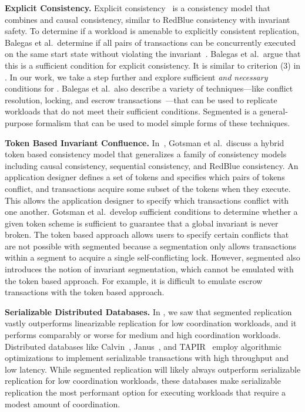 \textbf{Explicit Consistency.}
Explicit consistency~\cite{balegas2015towards} is a consistency model that
combines \invariantconfluence{} and causal consistency, similar to RedBlue
consistency with invariant safety. To determine if a workload is amenable to
explicitly consistent replication, Balegas et al.\ determine if all pairs of
transactions can be concurrently executed on the same start state without
violating the invariant~\cite{balegas2015towards}. Balegas et al.\ argue that
this is a sufficient condition for explicit consistency. It is similar to
criterion (3) in . In our work, we take a step further
and explore sufficient \emph{and necessary} conditions for
\invariantconfluence{}.
%
Balegas et al.\ also describe a variety of techniques---like conflict
resolution, locking, and escrow transactions~\cite{o1986escrow}---that can be
used to replicate workloads that do not meet their sufficient conditions.
Segmented \invariantconfluence{} is a general-purpose formalism that can be
used to model simple forms of these techniques.

\textbf{Token Based Invariant Confluence.}
In~\cite{gotsman2016cause}, Gotsman et al.\ discuss a hybrid token based
consistency model that generalizes a family of consistency models including
causal consistency, sequential consistency, and RedBlue consistency. An
application designer defines a set of tokens and specifies which pairs of
tokens conflict, and transactions acquire some subset of the tokens when they
execute. This allows the application designer to specify which transactions
conflict with one another.  Gotsman et al.\ develop sufficient conditions to
determine whether a given token scheme is sufficient to guarantee that a global
invariant is never broken. The token based approach allows users to
specify certain conflicts that are not possible with segmented
\invariantconfluence{} because a segmentation only allows transactions within a
segment to acquire a single self-conflicting lock. However, segmented
\invariantconfluence{} also introduces the notion of invariant segmentation,
which cannot be emulated with the token based approach. For example, it is
difficult to emulate escrow transactions with the token based approach.

\textbf{Serializable Distributed Databases.}
In , we saw that segmented \invariantconfluent{} replication
vastly outperforms linearizable replication for low coordination workloads, and
it performs comparably or worse for medium and high coordination workloads.
Distributed databases like Calvin~\cite{thomson2012calvin},
Janus~\cite{mu2016consolidating}, and TAPIR~\cite{zhang2015building} employ
algorithmic optimizations to implement serializable transactions with high
throughput and low latency.
%
While segmented \invariantconfluent{} replication will likely always outperform
serializable replication for low coordination workloads, these databases make
serializable replication the most performant option for executing workloads
that require a modest amount of coordination.

